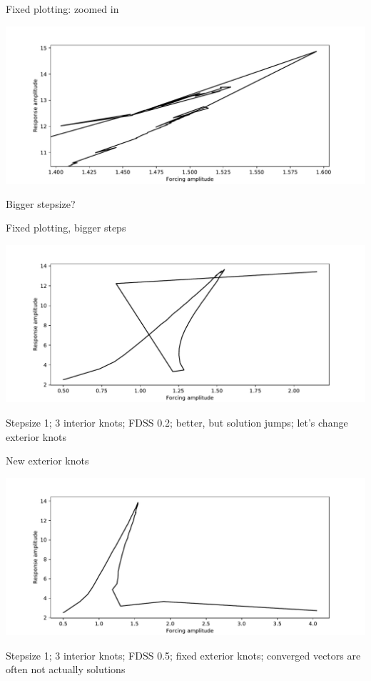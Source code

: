 \documentclass[presentation]{beamer}
\begin{document}
\begin{frame}[label={sec:orgff1e6b2}]{Fixed plotting: zoomed in}
\begin{center}
\includegraphics[width=.9\linewidth]{./stepsize0d1_dsize3_fdss0d2_fixed_plotting_ZOOM.pdf}
\end{center}

Bigger stepsize?
\end{frame}

\begin{frame}[label={sec:org9160a5c}]{Fixed plotting, bigger steps}
\begin{center}
\includegraphics[width=.9\linewidth]{./stepsize1_dsize3_fdss_0d2_fixed_plotting.pdf}
\end{center}

Stepsize 1; 3 interior knots; FDSS 0.2; better, but solution jumps; let's change exterior knots
\end{frame}

\begin{frame}[label={sec:org9bb7029}]{New exterior knots}
\begin{center}
\includegraphics[width=.9\linewidth]{./stepsize1_dsize3_fdss_0d5_fixed_plotting_new_exterior_knots.pdf}
\end{center}

Stepsize 1; 3 interior knots; FDSS 0.5; fixed exterior knots; \alert{converged vectors are often not actually solutions}
\end{frame}
\end{document}
